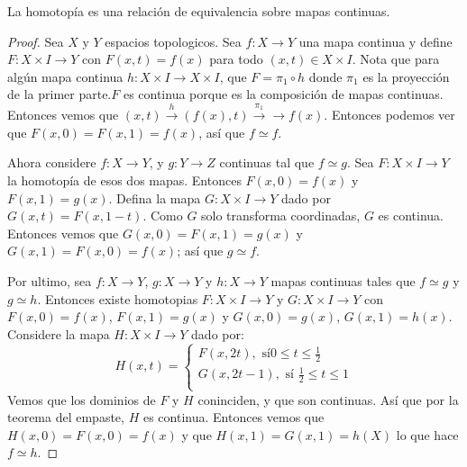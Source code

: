 \begin{lemma}\label{lemma_5.9}
    La homotop\'ia es una relaci\'on de equivalencia sobre mapas continuas.
\end{lemma}
\begin{proof}
    Sea $X$ y $Y$ espacios topologicos. Sea $f:X \xrightarrow{} Y$ una
    mapa continua y define $F:X \times I \xrightarrow{} Y$ con $F(x,t)=f(x)$
    para todo $(x,t) \in X \times I$. Nota que para alg\'un mapa continua $h:X
    \times I \xrightarrow{} X \times I$, que $F=\pi_1 \circ h$ donde $\pi_1$ es
    la proyecci\'on de la primer parte.$F$ es continua porque es la
    composici\'on de mapas continuas. Entonces vemos que $(x,t)
    \xrightarrow{h} (f(x),t) \xrightarrow{\pi_1} \xrightarrow{} f(x)$. Entonces
    podemos ver que $F(x,0)=F(x,1)=f(x)$, as\'i que $f \simeq f$.

    Ahora considere  $f:X \xrightarrow{} Y$, y $g:Y \xrightarrow{} Z$ continuas
    tal que $f \simeq g$. Sea  $F:X \times I \xrightarrow{} Y$ la homotop\'ia de
    esos dos mapas. Entonces $F(x,0)=f(x)$ y $F(x,1)=g(x)$. Defina la mapa $G:X
    \times I \xrightarrow{} Y$ dado por $G(x,t)=F(x,1-t)$. Como $G$ solo
    transforma coordinadas, $G$ es continua. Entonces vemos que
    $G(x,0)=F(x,1)=g(x)$ y $G(x,1)=F(x,0)=f(x)$; as\'i que $g \simeq f$.

    Por ultimo, sea  $f:X \xrightarrow{} Y$, $g:X \xrightarrow{} Y$ y $h:X
    \xrightarrow{} Y$ mapas continuas tales que $f \simeq g$ y $g \simeq h$.
    Entonces existe homotopias  $F:X \times I \xrightarrow{} Y$ y $G:X \times I
    \xrightarrow{} Y$ con $F(x,0)=f(x)$, $F(x,1)=g(x)$ y $G(x,0)=g(x)$,
    $G(x,1)=h(x)$. Considere la mapa $H:X \times I \xrightarrow{} Y$ dado por:
    \begin{equation*}
        H(x,t)=\begin{cases}
                F(x,2t), \text{ s\'i} 0 \leq t \leq \frac{1}{2} \\
                G(x,2t-1), \text{ s\'i } \frac{1}{2} \leq t \leq 1  \\
               \end{cases}
    \end{equation*}
    Vemos que los dominios de $F$ y $H$ coninciden, y que son continuas. As\'i
    que por la teorema del empaste, $H$ es continua. Entonces vemos que
    $H(x,0)=F(x,0)=f(x)$ y que $H(x,1)=G(x,1)=h(X)$ lo que hace $f \simeq h$.
\end{proof}

